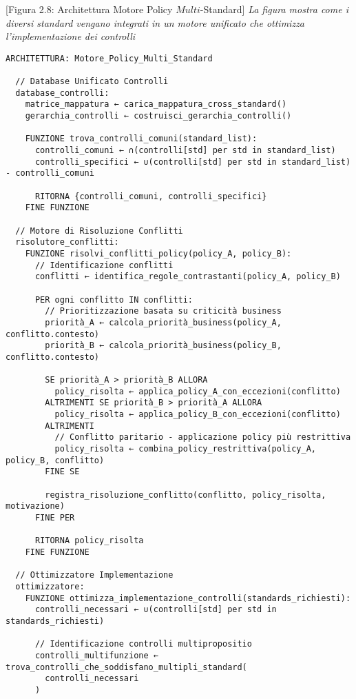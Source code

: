 {{[Figura 2.8: Architettura Motore Policy $Multi$-Standard]
\textit{La figura mostra come i diversi standard vengano integrati in un motore unificato che ottimizza l'implementazione dei controlli}

\begin{verbatim}
ARCHITETTURA: Motore_Policy_Multi_Standard

  // Database Unificato Controlli
  database_controlli:
    matrice_mappatura ← carica_mappatura_cross_standard()
    gerarchia_controlli ← costruisci_gerarchia_controlli()
    
    FUNZIONE trova_controlli_comuni(standard_list):
      controlli_comuni ← ∩(controlli[std] per std in standard_list)
      controlli_specifici ← ∪(controlli[std] per std in standard_list) - controlli_comuni
      
      RITORNA {controlli_comuni, controlli_specifici}
    FINE FUNZIONE

  // Motore di Risoluzione Conflitti
  risolutore_conflitti:
    FUNZIONE risolvi_conflitti_policy(policy_A, policy_B):
      // Identificazione conflitti
      conflitti ← identifica_regole_contrastanti(policy_A, policy_B)
      
      PER ogni conflitto IN conflitti:
        // Prioritizzazione basata su criticità business
        priorità_A ← calcola_priorità_business(policy_A, conflitto.contesto)
        priorità_B ← calcola_priorità_business(policy_B, conflitto.contesto)
        
        SE priorità_A > priorità_B ALLORA
          policy_risolta ← applica_policy_A_con_eccezioni(conflitto)
        ALTRIMENTI SE priorità_B > priorità_A ALLORA
          policy_risolta ← applica_policy_B_con_eccezioni(conflitto)
        ALTRIMENTI
          // Conflitto paritario - applicazione policy più restrittiva
          policy_risolta ← combina_policy_restrittiva(policy_A, policy_B, conflitto)
        FINE SE
        
        registra_risoluzione_conflitto(conflitto, policy_risolta, motivazione)
      FINE PER
      
      RITORNA policy_risolta
    FINE FUNZIONE

  // Ottimizzatore Implementazione
  ottimizzatore:
    FUNZIONE ottimizza_implementazione_controlli(standards_richiesti):
      controlli_necessari ← ∪(controlli[std] per std in standards_richiesti)
      
      // Identificazione controlli multipropositio
      controlli_multifunzione ← trova_controlli_che_soddisfano_multipli_standard(
        controlli_necessari
      )
      

\end{verbatim}}}
